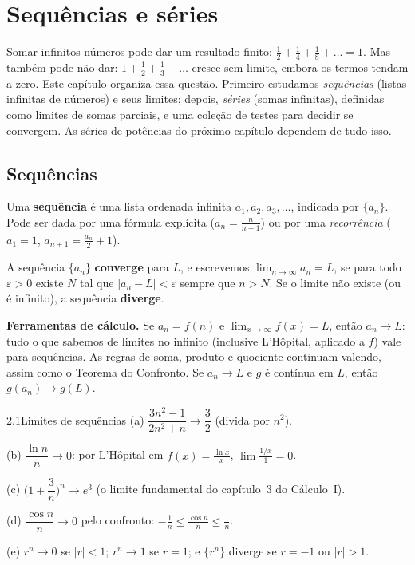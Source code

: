 \chapter{Sequências e séries}

Somar infinitos números pode dar um resultado finito: $\frac12+\frac14+\frac18+\dots=1$.
Mas também pode não dar: $1+\frac12+\frac13+\dots$ cresce sem limite, embora os termos
tendam a zero. Este capítulo organiza essa questão. Primeiro estudamos \emph{sequências}
(listas infinitas de números) e seus limites; depois, \emph{séries} (somas infinitas), definidas
como limites de somas parciais, e uma coleção de testes para decidir se convergem. As séries de
potências do próximo capítulo dependem de tudo isso.

\section{Sequências}

Uma \textbf{sequência} é uma lista ordenada infinita $a_1,a_2,a_3,\dots$,
indicada por $\{a_n\}$. Pode ser dada por uma fórmula explícita ($a_n=\frac n{n+1}$) ou por
uma \emph{recorrência} ($a_1=1$, $a_{n+1}=\frac{a_n}2+1$).

\begin{definicao}
A sequência $\{a_n\}$ \textbf{converge} para $L$, e escrevemos $\lim_{n\to\infty}a_n=L$, se para
todo $\varepsilon>0$ existe $N$ tal que $|a_n-L|<\varepsilon$ sempre que $n>N$. Se o limite não
existe (ou é infinito), a sequência \textbf{diverge}.
\end{definicao}

\textbf{Ferramentas de cálculo.} Se $a_n=f(n)$ e $\lim_{x\to\infty}f(x)=L$, então
$a_n\to L$: tudo o que sabemos de limites no infinito (inclusive L'Hôpital, aplicado a $f$)
vale para sequências. As regras de soma, produto e quociente continuam valendo, assim como o
Teorema do Confronto. Se $a_n\to L$ e $g$ é contínua em $L$, então $g(a_n)\to g(L)$.

\begin{exemplo}{2.1}{Limites de sequências}
(a) $\dfrac{3n^2-1}{2n^2+n}\to\dfrac32$ (divida por $n^2$).

(b) $\dfrac{\ln n}{n}\to0$: por L'Hôpital em $f(x)=\frac{\ln x}x$, $\lim\frac{1/x}1=0$.

(c) $\Big(1+\dfrac3n\Big)^n\to e^3$ (o limite fundamental do capítulo~3 do Cálculo~I).

(d) $\dfrac{\cos n}{n}\to0$ pelo confronto: $-\frac1n\le\frac{\cos n}n\le\frac1n$.

(e) $r^n\to0$ se $|r|<1$; $r^n\to1$ se $r=1$; e $\{r^n\}$ diverge se $r=-1$ ou $|r|>1$.
\end{exemplo}

